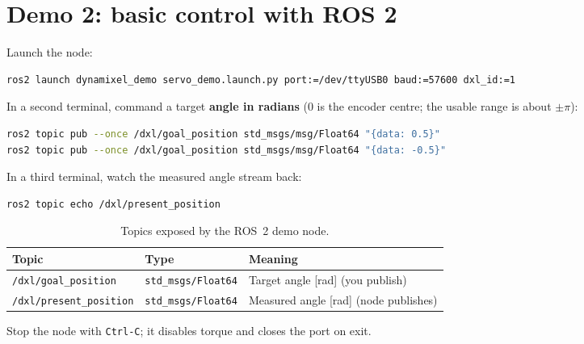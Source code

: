 \documentclass[11pt,a4paper]{article}
\begin{document}
\section{Demo 2: basic control with ROS 2}
Launch the node:
\begin{lstlisting}[language=bash]
ros2 launch dynamixel_demo servo_demo.launch.py port:=/dev/ttyUSB0 baud:=57600 dxl_id:=1
\end{lstlisting}

In a second terminal, command a target \textbf{angle in radians} (0 is the encoder
centre; the usable range is about $\pm\pi$):
\begin{lstlisting}[language=bash]
ros2 topic pub --once /dxl/goal_position std_msgs/msg/Float64 "{data: 0.5}"
ros2 topic pub --once /dxl/goal_position std_msgs/msg/Float64 "{data: -0.5}"
\end{lstlisting}

In a third terminal, watch the measured angle stream back:
\begin{lstlisting}[language=bash]
ros2 topic echo /dxl/present_position
\end{lstlisting}

\begin{table}[h]
\centering
\begin{tabular}{@{}lll@{}}
\toprule
\textbf{Topic} & \textbf{Type} & \textbf{Meaning} \\
\midrule
\texttt{/dxl/goal\_position} & \texttt{std\_msgs/Float64} & Target angle [rad] (you publish) \\
\texttt{/dxl/present\_position} & \texttt{std\_msgs/Float64} & Measured angle [rad] (node publishes) \\
\bottomrule
\end{tabular}
\caption{Topics exposed by the ROS~2 demo node.}
\end{table}
Stop the node with \texttt{Ctrl-C}; it disables torque and closes the port on exit.

\end{document}

